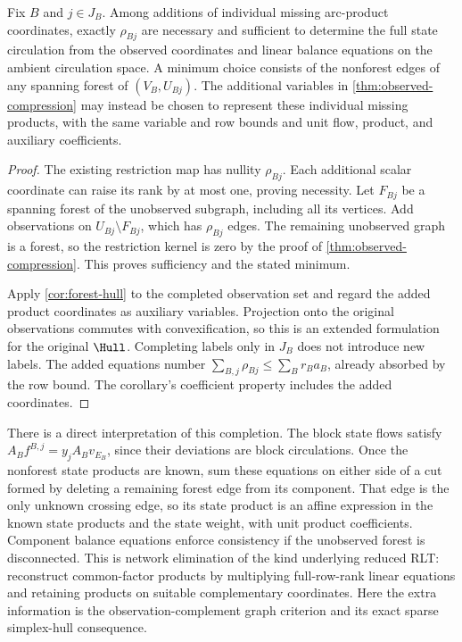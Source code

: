 \begin{proposition}\label{prop:minimum-completion}
Fix $B$ and $j\in J_B$. Among additions of individual missing arc-product
coordinates, exactly $\rho_{Bj}$ are necessary and sufficient to determine
the full state circulation from the observed coordinates and linear balance
equations on the ambient circulation space. A minimum choice consists of
the nonforest edges of any spanning forest of $(V_B,U_{Bj})$.
The additional variables in \cref{thm:observed-compression} may instead be
chosen to represent these individual missing products, with the same
variable and row bounds and unit flow, product, and auxiliary coefficients.
\end{proposition}
\begin{proof}
The existing restriction map has nullity $\rho_{Bj}$. Each additional
scalar coordinate can raise its rank by at most one, proving necessity.
Let $F_{Bj}$ be a spanning forest of the unobserved subgraph, including
all its vertices. Add observations on $U_{Bj}\setminus F_{Bj}$, which
has $\rho_{Bj}$ edges. The remaining unobserved graph is a forest, so
the restriction kernel is zero by the proof of
\cref{thm:observed-compression}. This proves sufficiency and the stated
minimum.

Apply \cref{cor:forest-hull} to the completed observation set and regard
the added product coordinates as auxiliary variables. Projection onto the
original observations commutes with convexification, so this is an extended
formulation for the original $\Hull$. Completing labels only in $J_B$
does not introduce new labels. The added equations number
$\sum_{B,j}\rho_{Bj}\le\sum_Br_Ba_B$, already absorbed by the row
bound. The corollary's coefficient property includes the added coordinates.
\end{proof}

There is a direct interpretation of this completion. The block state flows
satisfy $A_Bf^{B,j}=y_jA_Bv_{E_B}$, since their deviations are block
circulations. Once the nonforest state products are known, sum these
equations on either side of a cut formed by deleting a remaining forest
edge from its component. That edge is the only
unknown crossing edge, so its state product is an affine expression in the
known state products and the state weight, with unit product coefficients.
Component balance equations enforce consistency if the unobserved forest
is disconnected. This is network elimination of the kind underlying reduced
RLT: \citet[Theorem~3.1 and Section~2]{LibertiPantelides2006} reconstruct
common-factor products by multiplying full-row-rank linear equations and
retaining products on suitable complementary coordinates. Here the extra
information is the observation-complement graph criterion and its exact
sparse simplex-hull consequence.

